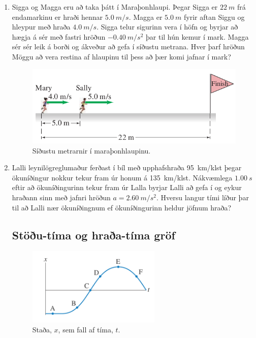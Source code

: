 \ifdefined \wholebook \else\documentclass[oneside]{book}\usepackage{EdlBook}\graphicspath{{figures/}}
\begin{document}
\begin{enumerate}[label = \textbf{Dæmi \thechapter.\arabic*.}]
\item Sigga og Magga eru að taka þátt í Maraþonhlaupi. Þegar Sigga er $\SI{22}{m}$ frá endamarkinu er hraði hennar $\SI{5.0}{m/s}$. Magga er $\SI{5.0}{m}$ fyrir aftan Siggu og hleypur með hraða $\SI{4.0}{m/s}$. Sigga telur sigurinn vera í höfn og byrjar að hægja á sér með fastri hröðun $-\SI{0.40}{m/s^2}$ þar til hún kemur í mark. Magga sér sér leik á borði og ákveður að gefa í síðustu metrana. Hver þarf hröðun Möggu að vera restina af hlaupinu til þess að þær komi jafnar 
í mark?

\begin{figure}[H]
    \centering
    \includegraphics[scale = 0.35]{images/kapphlaup.png}
    \caption{Síðustu metrarnir í maraþonhlaupinu.}
    \label{fig:kapphlaup}
\end{figure}

\item Lalli leynilögreglumaður ferðast í bíl með upphafshraða \SI{95}{km/klst} þegar ökuníðingur nokkur tekur fram úr honum á \SI{135}{km/klst}. Nákvæmlega $\SI{1.00}{s}$ eftir að ökuníðingurinn tekur fram úr Lalla byrjar Lalli að gefa í og eykur hraðann sinn með jafnri hröðun $a = \SI{2.60}{m/s^2}$. Hversu langur tími líður þar til að Lalli nær ökuníðingnum ef ökuníðingurinn heldur jöfnum hraða? 

\subsection*{Stöðu-tíma og hraða-tíma gröf}

\begin{minipage}{\linewidth}

\begin{figure}
\vspace{-1cm}
\centering
\includegraphics[width=2.5in]{images/stada.png}
\caption{Staða, $x$, sem fall af tíma, $t$.}
\label{fig:stodutima}
\end{figure}


\end{minipage}
\end{enumerate}
\end{document}
